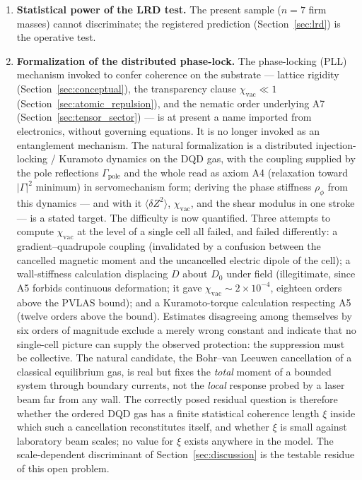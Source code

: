 \documentclass[11pt,a4paper]{article}
\theoremstyle{plain}
\theoremstyle{remark}
\begin{document}
\begin{enumerate}
    \item \textbf{Statistical power of the LRD test.} The present sample ($n=7$ firm masses) cannot discriminate; the registered prediction (Section~\ref{sec:lrd}) is the operative test.
    \item \textbf{Formalization of the distributed phase-lock.} The phase-locking (PLL) mechanism invoked to confer coherence on the substrate --- lattice rigidity (Section~\ref{sec:conceptual}), the transparency clause $\chi_{\text{vac}}\ll1$ (Section~\ref{sec:atomic_repulsion}), and the nematic order underlying A7 (Section~\ref{sec:tensor_sector}) --- is at present a name imported from electronics, without governing equations. It is no longer invoked as an entanglement mechanism. The natural formalization is a distributed injection-locking / Kuramoto dynamics on the DQD gas, with the coupling supplied by the pole reflections $\Gamma_{\text{pole}}$ and the whole read as axiom A4 (relaxation toward $|\Gamma|^2$ minimum) in servomechanism form; deriving the phase stiffness $\rho_\phi$ from this dynamics --- and with it $\langle\delta Z^2\rangle$, $\chi_{\text{vac}}$, and the shear modulus in one stroke --- is a stated target. The difficulty is now quantified. Three attempts to compute $\chi_{\text{vac}}$ at the level of a single cell all failed, and failed differently: a gradient--quadrupole coupling (invalidated by a confusion between the cancelled magnetic moment and the uncancelled electric dipole of the cell); a wall-stiffness calculation displacing $D$ about $D_0$ under field (illegitimate, since A5 forbids continuous deformation; it gave $\chi_{\text{vac}} \sim 2\times10^{-4}$, eighteen orders above the PVLAS bound); and a Kuramoto-torque calculation respecting A5 (twelve orders above the bound). Estimates disagreeing among themselves by six orders of magnitude exclude a merely wrong constant and indicate that no single-cell picture can supply the observed protection: the suppression must be collective. The natural candidate, the Bohr--van Leeuwen cancellation of a classical equilibrium gas, is real but fixes the \emph{total} moment of a bounded system through boundary currents, not the \emph{local} response probed by a laser beam far from any wall. The correctly posed residual question is therefore whether the ordered DQD gas has a finite statistical coherence length $\xi$ inside which such a cancellation reconstitutes itself, and whether $\xi$ is small against laboratory beam scales; no value for $\xi$ exists anywhere in the model. The scale-dependent discriminant of Section~\ref{sec:discussion} is the testable residue of this open problem.

\end{enumerate}
\end{document}
